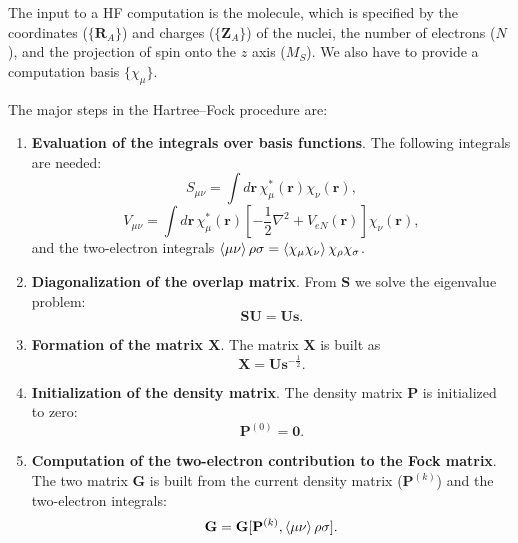 \documentclass[../Main/chem532-notes.tex]{subfiles}
\begin{document}
The input to a HF computation is the molecule, which is specified by the coordinates ($\{\mathbf{R}_A\}$) and charges ($\{\mathbf{Z}_A\}$) of the nuclei, the number of electrons ($N$), and the projection of spin onto the $z$ axis ($M_S$).
We also have to provide a computation basis $\{\chi_\mu\}$.

The major steps in the Hartree--Fock procedure are:
\begin{enumerate}
\item \textbf{Evaluation of the integrals over basis functions}. The following integrals are needed:
\begin{equation}
S_{\mu\nu} = \int d\mathbf{r} \, \chi_\mu^*(\mathbf{r}) \chi_\nu(\mathbf{r}),
\end{equation}
\begin{equation}
V_{\mu\nu} = \int d\mathbf{r} \, \chi_\mu^*(\mathbf{r}) [-\frac{1}{2}\nabla^2 + V_{eN}(\mathbf{r})]\chi_\nu(\mathbf{r}),
\end{equation}
and the two-electron integrals $\braket{\mu\nu}{\rho\sigma} = \braket{\chi_\mu\chi_\nu}{\chi_\rho\chi_\sigma}$.

\item \textbf{Diagonalization of the overlap matrix}. From $\mathbf{S}$ we solve the eigenvalue problem:
\begin{equation}
\mathbf{SU} = \mathbf{Us}.
\end{equation}

\item \textbf{Formation of the matrix $\mathbf{X}$}. The matrix $\mathbf{X}$ is built as
\begin{equation}
\mathbf{X} = \mathbf{U}\mathbf{s}^{-\frac{1}{2}}.
\end{equation}

\item \textbf{Initialization of the density matrix}. The density matrix $\mathbf{P}$ is initialized to zero:
\begin{equation}
\mathbf{P}^{(0)} = \mathbf{0}.
\end{equation}

\item \textbf{Computation of the two-electron contribution to the Fock matrix}. The two matrix $\mathbf{G}$ is built from the current density matrix ($\mathbf{P}^{(k)}$) and the two-electron integrals:
\begin{equation}
\mathbf{G} = \mathbf{G}[\mathbf{P}^{(k)},\braket{\mu\nu}{\rho\sigma}].
\end{equation}


\end{enumerate}
\end{document}
